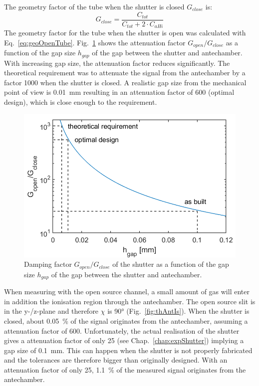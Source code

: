	The geometry factor of the tube when the shutter is closed $G_{close}$ is:
	\begin{equation}
		G_{close} = \frac{C_{tot}}{C_{tot} + 2\cdot C_{aHi}}
	\end{equation}
	The geometry factor for the tube when the shutter is open was calculated with Eq.~\eqref{eq:geoOpenTube}. Fig.~\ref{fig:ShutGapSizeSigDamp} shows the attenuation factor $G_{open}/G_{close}$ as a function of the gap size $h_{gap}$ of the gap between the shutter and antechamber. With increasing gap size, the attenuation factor reduces significantly. The theoretical requirement was to attenuate the signal from the antechamber by a factor 1000 when the shutter is closed. A realistic gap size from the mechanical point of view is 0.01~mm resulting in an attenuation factor of 600 (optimal design), which is close enough to the requirement.
	\begin{figure}[h!]
		\centering
		\includegraphics[width=.8\textwidth]{Bilder/Motor_1p2mm.png}
		\caption{Damping factor $G_{open}/G_{close}$ of the shutter as a function of the gap size $h_{gap}$ of the gap between the shutter and antechamber.}
		\label{fig:ShutGapSizeSigDamp}
	\end{figure}
	When measuring with the open source channel, a small amount of gas will enter in addition the ionisation region through the antechamber. The open source slit is in the y-/z-plane and therefore $\chi$ is 90° (Fig.~\ref{fig:thAntIs}). When the shutter is closed, about 0.05~\% of the signal originates from the antechamber, assuming a attenuation factor of 600.
	Unfortunately, the actual realisation of the shutter gives a attenuation factor of only 25 (see Chap.~\ref{chap:expShutter}) implying a gap size of 0.1~mm. This can happen when the shutter is not properly fabricated and the tolerances are therefore bigger than originally designed. With an attenuation factor of only 25, 1.1~\% of the measured signal originates from the antechamber.\\
	
